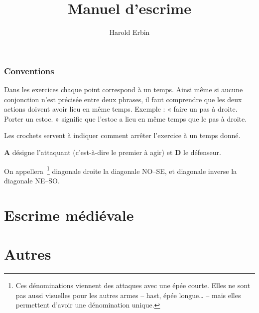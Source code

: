 \documentclass[10pt, a4paper, oneside]{book}
\title{Manuel d'escrime}
\author{Harold Erbin}
\theoremstyle{break}
\newcommand{\A}[0]{\textbf{A}\xspace}
\newcommand{\D}[0]{\textbf{D}\xspace}
\begin{document}
\maketitle
{}
\version
\newpage
\tableofcontents
\newpage

\section{Conventions}

Dans les exercices chaque point correspond à un temps. Ainsi même si aucune conjonction n'est précisée entre deux phrases, il faut comprendre que les deux actions doivent avoir lieu en même temps. Exemple : « faire un pas à droite. Porter un estoc. » signifie que l'estoc a lieu en même temps que le pas à droite.

Les crochets servent à indiquer comment arrêter l'exercice à un temps donné.

\A désigne l'attaquant (c'est-à-dire le premier à agir) et \D le défenseur.

On appellera~\footnote{Ces dénominations viennent des attaques avec une épée courte. Elles ne sont pas aussi visuelles pour les autres armes – hast, épée longue… – mais elles permettent d'avoir une dénomination unique.} diagonale droite la diagonale NO–SE, et diagonale inverse la diagonale NE–SO.

\part{Escrime médiévale}




\part{Autres}




\printbibliography[heading=bibintoc]
\end{document}
